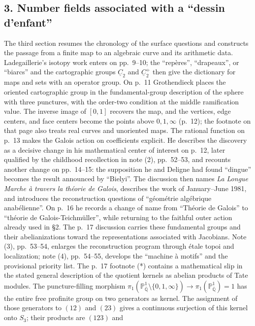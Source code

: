 \subsection*{3. Number fields associated with a ``dessin d'enfant''}
The third section resumes the chronology of the surface questions and
constructs the passage from a finite map to an algebraic curve and its
arithmetic data. Ladegaillerie's isotopy work enters on pp.~9--10; the
``repères'', ``drapeaux'', or ``biarcs'' and the cartographic groups
$\underline C_2$ and $\underline C_2^+$ then give the dictionary for maps
and sets with an operator group. On p.~11 Grothendieck places the oriented
cartographic group in the fundamental-group description of the sphere
with three punctures, with the order-two condition at the middle
ramification value. The inverse image of $[0,1]$ recovers the map, and
the vertices, edge centers, and face centers become the points above
$0,1,\infty$ (p.~12); the footnote on that page also treats real curves
and unoriented maps. The rational function on p.~13 makes the Galois
action on coefficients explicit. He describes the discovery as a decisive
change in his mathematical center of interest on p.~12, later qualified
by the childhood recollection in note (2), pp.~52--53, and recounts
another change on pp.~14--15: the supposition he and Deligne had found
``dingue'' becomes the result announced by ``Bielyi''. The discussion then
names \emph{La Longue Marche à travers la théorie de Galois}, describes
the work of January--June 1981, and introduces the reconstruction questions
of ``géométrie algébrique anabélienne''. On p.~16 he records a change of
name from ``Théorie de Galois'' to ``théorie de Galois-Teichmüller'', while
returning to the faithful outer action already used in \S2. The p.~17
discussion carries these fundamental groups and their abelianizations
toward the representations associated with Jacobians. Note (3),
pp.~53--54, enlarges the reconstruction program through étale topoi
and localization; note (4), pp.~54--55, develops the ``machine à motifs''
and the provisional priority list. The p.~17 footnote (*)
contains a mathematical slip in the stated general description of the
quotient kernels as abelian products of Tate modules. The puncture-filling
morphism
$\pi_1(\mathbb P^1_{\overline{\mathbb Q}}\setminus\{0,1,\infty\})
\longrightarrow\pi_1(\mathbb P^1_{\overline{\mathbb Q}})=1$
has the entire free profinite group on two generators as kernel. The
assignment of those generators to $(12)$ and $(23)$ gives a continuous
surjection of this kernel onto $S_3$; their products are $(123)$ and

